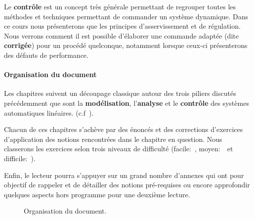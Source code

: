 Le \textbf{contrôle} est un concept très générale permettant de regrouper
toutes les méthodes et techniques permettant de commander un système dynamique.
Dans ce cours nous présenterons que les principes d'asservissement et de 
régulation. Nous verrons comment il est possible d'élaborer une commande 
adaptée (dite \textbf{corrigée}) pour un procédé quelconque, notamment 
lorsque ceux-ci présenterons des défauts de performance.

\paragraph{Organisation du document}
Les chapitres suivent un découpage classique autour des trois piliers 
discutés précédemment que sont la \textbf{modélisation}, l'\textbf{analyse} 
et le \textbf{contrôle} des systèmes automatiques linéaires. 
(c.f~).

Chacun de ces chapitres s'achève par des énoncés et des corrections d'exercices 
d'application des notions rencontrées dans le chapitre en question. 
Nous classerons les exercices selon trois niveaux de difficulté 
(facile:~\facile, moyen:~\moyen~et difficile:~\difficile).

Enfin, le lecteur pourra s'appuyer sur un grand nombre d'annexes qui ont pour
objectif de rappeler et de détailler des notions pré-requises ou encore
approfondir quelques aspects hors programme pour une deuxième lecture.
\begin{figure}[!h]
    \renewcommand\thefigure{A}
    \centering
        {
            \tikzset{external/export=false}
            
        }
    \caption{Organisation du document.\label{fig-diagramme_cours}}
\end{figure}
